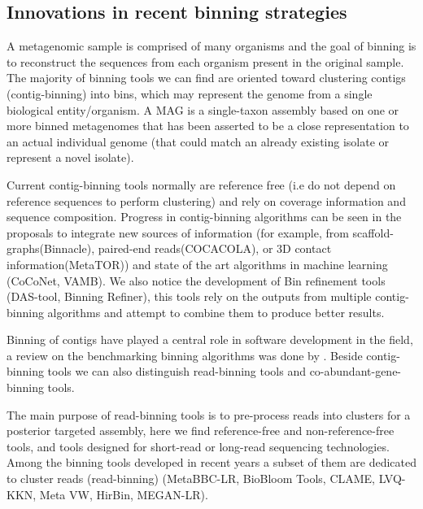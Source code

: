 \documentclass{article}
\begin{document}
\subsection{Innovations in recent binning strategies}

A metagenomic sample is comprised of many organisms and the goal of binning is to reconstruct the sequences from each organism present in the original sample.
The majority of binning tools we can find are oriented toward clustering contigs (contig-binning) into bins, which may represent the genome from a single biological entity/organism. A \gls{MAG} is a single-taxon assembly based on one or more binned metagenomes that has been asserted to be a close representation to an actual individual genome (that could match an already existing isolate or represent a novel isolate).

Current contig-binning tools normally are reference free (i.e do not depend on reference sequences to perform clustering) and rely on coverage information and sequence composition.  
Progress in contig-binning algorithms can be seen in the proposals to integrate new sources of information (for example, from scaffold-graphs(Binnacle), paired-end reads(COCACOLA), or 3D contact information(MetaTOR)) and state of the art algorithms in machine learning (CoCoNet, \gls{VAMB}).
We also notice the development of Bin refinement tools (DAS-tool, Binning Refiner), this tools rely on the outputs from multiple contig-binning algorithms and attempt to combine them to produce better results.

Binning of contigs have played a central role in software development in the field, a review on the benchmarking binning algorithms was done by . 
Beside contig-binning tools we can also distinguish read-binning tools and co-abundant-gene-binning tools.

The main purpose of read-binning tools is to pre-process reads into clusters for a posterior targeted assembly, here we find reference-free and non-reference-free tools, and tools designed for short-read or long-read sequencing technologies. Among the binning tools developed in recent years a subset of them are dedicated to cluster reads (read-binning) (MetaBBC-LR, BioBloom Tools, CLAME, LVQ-KKN, Meta VW, HirBin, MEGAN-LR).
\end{document}
